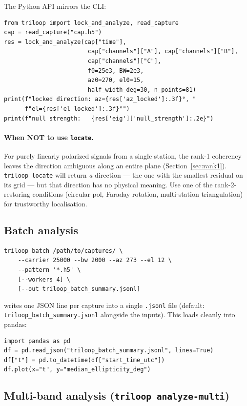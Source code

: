\documentclass[11pt]{article}
\begin{document}
The Python API mirrors the CLI:
\begin{lstlisting}[style=py]
from triloop import lock_and_analyze, read_capture
cap = read_capture("cap.h5")
res = lock_and_analyze(cap["time"],
                        cap["channels"]["A"], cap["channels"]["B"],
                        cap["channels"]["C"],
                        f0=25e3, BW=2e3,
                        az0=270, el0=15,
                        half_width_deg=30, n_points=81)
print(f"locked direction: az={res['az_locked']:.3f}°, "
      f"el={res['el_locked']:.3f}°")
print(f"null strength:   {res['eig']['null_strength']:.2e}")
\end{lstlisting}

\paragraph{When NOT to use \texttt{locate}.}  For purely linearly
polarized signals from a single station, the rank-1 coherency leaves
the direction ambiguous along an entire plane (Section~\ref{sec:rank1}).
\texttt{triloop locate} will return \emph{a} direction --- the one
with the smallest residual on its grid --- but that direction has no
physical meaning.  Use one of the rank-2-restoring conditions
(circular pol, Faraday rotation, multi-station triangulation) for
trustworthy localisation.

\subsection{Batch analysis}

\begin{lstlisting}[style=shell]
triloop batch /path/to/captures/ \
    --carrier 25000 --bw 2000 --az 273 --el 12 \
    --pattern '*.h5' \
    [--workers 4] \
    [--out triloop_batch_summary.jsonl]
\end{lstlisting}

writes one JSON line per capture into a single \texttt{.jsonl} file
(default: \texttt{triloop\_batch\_summary.jsonl} alongside the inputs).
This loads cleanly into pandas:

\begin{lstlisting}[style=py]
import pandas as pd
df = pd.read_json("triloop_batch_summary.jsonl", lines=True)
df["t"] = pd.to_datetime(df["start_time_utc"])
df.plot(x="t", y="median_ellipticity_deg")
\end{lstlisting}

\subsection{Multi-band analysis (\texttt{triloop analyze-multi})}
\label{sec:multiband}
\end{document}
